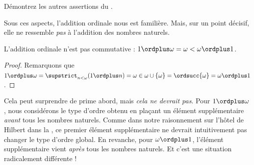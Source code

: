 \documentclass[../../../include/open-logic-section]{subfiles}
\begin{document}
\begin{prob}
Démontrez les autres assertions du
.
\end{prob}

Sous ces aspects, l'addition ordinale nous est familière.
Mais, sur un point décisif, elle ne ressemble
\emph{pas} à l'addition des nombres naturels.

\begin{prop}
L'addition ordinale n'est {pas} commutative :
$1 \ordplus \omega = \omega <
\omega \ordplus 1$.
\end{prop}

\begin{proof}
Remarquons que
$1 \ordplus \omega =
\supstrict_{n < \omega} (1 \ordplus n)
= \omega \in \omega \cup \{\omega\}
= \ordsucc{\omega} = \omega \ordplus 1$.
\end{proof}
\noindent
Cela peut surprendre de prime abord, mais
\emph{cela ne devrait pas}. Pour
$1 \ordplus \omega$, nous considérons le type
d'ordre obtenu en plaçant un élément supplémentaire
\emph{avant} tous les nombres naturels. Comme dans
notre raisonnement sur l'hôtel de Hilbert dans la
, ce premier
élément supplémentaire ne devrait intuitivement
pas changer le type d'ordre global. En revanche,
pour $\omega \ordplus 1$, l'élément supplémentaire
vient \emph{après} tous les nombres naturels.
Et c'est une situation radicalement différente !
\end{document}
